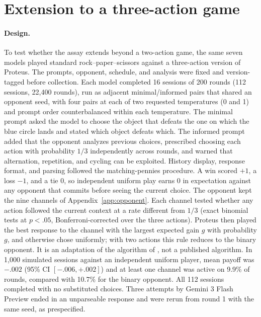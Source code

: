 \section{Extension to a three-action game}\label{app:rps}

\paragraph{Design.} To test whether the assay extends beyond a two-action game, the same seven models played standard rock--paper--scissors against a three-action version of Proteus. The prompts, opponent, schedule, and analysis were fixed and version-tagged before collection. Each model completed 16 sessions of 200 rounds (112 sessions, 22,400 rounds), run as adjacent minimal/informed pairs that shared an opponent seed, with four pairs at each of two requested temperatures (0 and 1) and prompt order counterbalanced within each temperature. The minimal prompt asked the model to choose the object that defeats the one on which the blue circle lands and stated which object defeats which. The informed prompt added that the opponent analyzes previous choices, prescribed choosing each action with probability $1/3$ independently across rounds, and warned that alternation, repetition, and cycling can be exploited. History display, response format, and parsing followed the matching-pennies procedure. A win scored $+1$, a loss $-1$, and a tie $0$, so independent uniform play earns 0 in expectation against any opponent that commits before seeing the current choice. The opponent kept the nine channels of Appendix~\ref{app:opponent}. Each channel tested whether any action followed the current context at a rate different from $1/3$ (exact binomial tests at $p<.05$, Bonferroni-corrected over the three actions). Proteus then played the best response to the channel with the largest expected gain $g$ with probability $g$, and otherwise chose uniformly; with two actions this rule reduces to the binary opponent. It is an adaptation of the algorithm of \citet{Lee2004}, not a published algorithm. In 1,000 simulated sessions against an independent uniform player, mean payoff was $-.002$ (95\% CI $[-.006, +.002]$) and at least one channel was active on 9.9\% of rounds, compared with 10.7\% for the binary opponent. All 112 sessions completed with no substituted choices. Three attempts by Gemini 3 Flash Preview ended in an unparseable response and were rerun from round 1 with the same seed, as prespecified.


